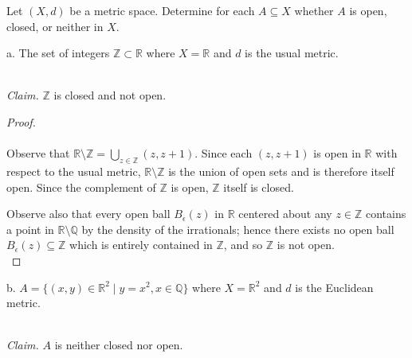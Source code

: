 Let $(X, d)$ be a metric space. Determine for each $A \subseteq X$ whether $A$ is open, closed, or neither in $X$.

a.  The set of integers $\mathbb{Z} \subset \mathbb{R}$ where $X = \mathbb{R}$ and $d$ is the usual metric.

\ \\
\emph{Claim.} $\mathbb{Z}$ is closed and not open.

\begin{proof}\ \\\\
    Observe that $\mathbb{R} \setminus \mathbb{Z} = \bigcup\limits_{z \in \mathbb{Z}}{(z, z + 1)}$. Since each 
    $(z, z + 1)$ is open in $\mathbb{R}$ with respect to the usual metric, $\mathbb{R} \setminus \mathbb{Z}$ is the
    union of open sets and is therefore itself open. Since the complement of $\mathbb{Z}$ is open, $\mathbb{Z}$ itself
    is closed.

    Observe also that every open ball $B_\epsilon(z)$ in $\mathbb{R}$ centered about any $z \in \mathbb{Z}$ contains a 
    point in $\mathbb{R} \setminus \mathbb{Q}$ by the density of the irrationals; hence there exists no open ball 
    $B_\epsilon(z) \subseteq \mathbb{Z}$ which is entirely contained in $\mathbb{Z}$, and so $\mathbb{Z}$ is not open.
    \ \\
\end{proof}

\pagebreak

b.  $A = \{(x, y) \in \mathbb{R}^2 \mid y=x^2, x \in \mathbb{Q} \}$ where $X = \mathbb{R}^2$ and $d$ is the Euclidean
     metric.

\ \\
\emph{Claim.} $A$ is neither closed nor open.

